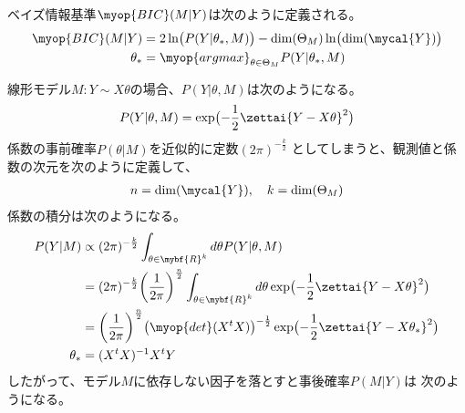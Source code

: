 		\begin{definition}[BIC]\label{def:BIC} %
			ベイズ情報基準$\myop{BIC}(M|Y)$は次のように定義される。
			\begin{equation*}\begin{split} %
				\myop{BIC}(M|Y) &= 2\ln\bigl(P(Y|\theta_*,M)\bigr)
					- \dim(\Theta_M)\ln\bigl(\dim(\mycal{Y})\bigr) \\
				\theta_* &= \myop{argmax}_{\theta\in\Theta_M}P(Y|\theta_*,M)
			\end{split}\end{equation*} %
		\end{definition} %

		\begin{example}[線形モデルでの積分]\label{eg:線形モデルでの積分} %
			線形モデル$M:Y\sim X\theta$の場合、$P(Y|\theta,M)$は次のようになる。
			\begin{equation*}\begin{split} %
				P(Y|\theta,M) = \exp\bigl(-\frac{1}{2}\zettai{Y-X\theta}^2\bigr)
			\end{split}\end{equation*} %
			係数の事前確率$P(\theta|M)$を近似的に定数$(2\pi)^{-\frac{k}{2}}$
			としてしまうと、観測値と係数の次元を次のように定義して、
			\begin{equation*}\begin{split} %
				n = \dim(\mycal{Y}),\quad k = \dim(\Theta_M)
			\end{split}\end{equation*} %
			係数の積分は次のようになる。
			\begin{equation*}\begin{split} %
				P(Y|M) &\propto (2\pi)^{-\frac{k}{2}}
					\int_{\theta\in\mybf{R}^k}d\theta P(Y|\theta,M) \\
				&= (2\pi)^{-\frac{k}{2}}\biggl(\frac{1}{2\pi}\biggr)^{\frac{n}{2}}
					\int_{\theta\in\mybf{R}^k}d\theta
					\exp\bigl(-\frac{1}{2}\zettai{Y-X\theta}^2\bigr) \\
				&= 
				\biggl(\frac{1}{2\pi}\biggr)^{\frac{n}{2}}
					\bigl(\myop{det}(X^tX)\bigr)^{-\frac{1}{2}}
					\exp\bigl(-\frac{1}{2}\zettai{Y-X\theta_*}^2\bigr) \\
				\theta_* &= (X^tX)^{-1}X^tY \\
			\end{split}\end{equation*} %
			したがって、モデル$M$に依存しない因子を落とすと事後確率$P(M|Y)$は
			次のようになる。
			\begin{equation*}\begin{split} %

\end{split}
\end{equation*}
\end{example}
